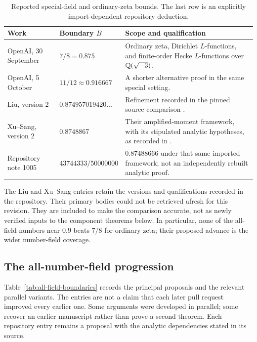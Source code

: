 \begin{table}[htbp]
\centering\small
\caption{Reported special-field and ordinary-zeta bounds. The last row is an explicitly import-dependent repository deduction.}\label{tab:special-boundaries}
\begin{tabular}{@{}>{\raggedright\arraybackslash}p{4.4cm}>{\raggedright\arraybackslash}p{3.1cm}>{\raggedright\arraybackslash}p{6.1cm}@{}}
\toprule
Work & Boundary $B$ & Scope and qualification\\
\midrule
OpenAI, 30 September \cite{OAI30} & $7/8=0.875$ & Ordinary zeta, Dirichlet $L$-functions, and finite-order Hecke $L$-functions over $\mathbb Q(\sqrt{-3})$.\\[5pt]
OpenAI, 5 October \cite{OAI05} & $11/12\approx0.916667$ & A shorter alternative proof in the same special setting.\\[5pt]
Liu, version 2 \cite{Liu26} & $0.874957019420\ldots$ & Refinement recorded in the pinned source comparison \cite{R1002}.\\[5pt]
Xu--Sang, version 2 \cite{XS26} & $0.8748867$ & Their amplified-moment framework, with its stipulated analytic hypotheses, as recorded in \cite{R1005}.\\[5pt]
Repository note 1005 \cite{R1005} & $43744333/50000000$ & $0.87488666$ under that same imported framework; not an independently rebuilt analytic proof.\\
\bottomrule
\end{tabular}
\end{table}

The Liu and Xu--Sang entries retain the versions and qualifications recorded in the repository. Their primary bodies could not be retrieved afresh for this revision. They are included to make the comparison accurate, not as newly verified inputs to the component theorems below. In particular, none of the all-field numbers near $0.9$ beats $7/8$ for ordinary zeta; their proposed advance is the wider number-field coverage.

\subsection{The all-number-field progression}

Table~\ref{tab:all-field-boundaries} records the principal proposals and the relevant parallel variants. The entries are not a claim that each later pull request improved every earlier one. Some arguments were developed in parallel; some recover an earlier manuscript rather than prove a second theorem. Each repository entry remains a proposal with the analytic dependencies stated in its source.

